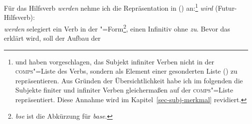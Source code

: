 Für das Hilfsverb \emph{werden} nehme ich die Repräsentation in () an:\footnote{\label{subj-fn}%
        \citet{Pollard90a} und \citet*{Kiss92} haben vorgeschlagen, das Subjekt infiniter
Verben nicht in der \textsc{comps}"=Liste des Verbs, sondern als Element einer gesonderten Liste (\subj)
zu repräsentieren. Aus Gründen der Übersichtlichkeit habe ich im folgenden die Subjekte finiter
und infiniter Verben gleichermaßen auf der \textsc{comps}"=Liste repräsentiert. Diese Annahme
wird im Kapitel~\ref{sec-subj-merkmal} revidiert.%
}
\eas
\label{le-wird}%
\emph{wird} (Futur-Hilfsverb):\\
\zs
\emph{werden} selegiert ein Verb in der "=Form\footnote{%
  \emph{bse} ist die Abkürzung für \emph{base}.%
}, \dash einen Infinitiv ohne \emph{zu}. Bevor das \lexm erklärt wird, soll der Aufbau der \compsl

